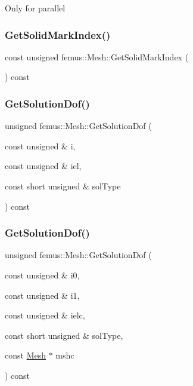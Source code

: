 Only for parallel \mbox{\label{classfemus_1_1_mesh_af93502ef0cff075207cc259c90982fd9}} 
\subsubsection{\texorpdfstring{Get\+Solid\+Mark\+Index()}{GetSolidMarkIndex()}}
{\footnotesize\ttfamily const unsigned femus\+::\+Mesh\+::\+Get\+Solid\+Mark\+Index (\begin{DoxyParamCaption}{ }\end{DoxyParamCaption}) const\hspace{0.3cm}{\ttfamily [inline]}}

\mbox{\label{classfemus_1_1_mesh_ace44edec2dc2ffb42c0456f03fa227ff}} 
\subsubsection{\texorpdfstring{Get\+Solution\+Dof()}{GetSolutionDof()}\hspace{0.1cm}{\footnotesize\ttfamily [1/2]}}
{\footnotesize\ttfamily unsigned femus\+::\+Mesh\+::\+Get\+Solution\+Dof (\begin{DoxyParamCaption}\item[{const unsigned \&}]{i,  }\item[{const unsigned \&}]{iel,  }\item[{const short unsigned \&}]{sol\+Type }\end{DoxyParamCaption}) const}

\mbox{\label{classfemus_1_1_mesh_aac0b33172ecf115925d50d42924d68ac}} 
\subsubsection{\texorpdfstring{Get\+Solution\+Dof()}{GetSolutionDof()}\hspace{0.1cm}{\footnotesize\ttfamily [2/2]}}
{\footnotesize\ttfamily unsigned femus\+::\+Mesh\+::\+Get\+Solution\+Dof (\begin{DoxyParamCaption}\item[{const unsigned \&}]{i0,  }\item[{const unsigned \&}]{i1,  }\item[{const unsigned \&}]{ielc,  }\item[{const short unsigned \&}]{sol\+Type,  }\item[{const \mbox{\hyperlink{classfemus_1_1_mesh}{Mesh}} $\ast$}]{mshc }\end{DoxyParamCaption}) const}

